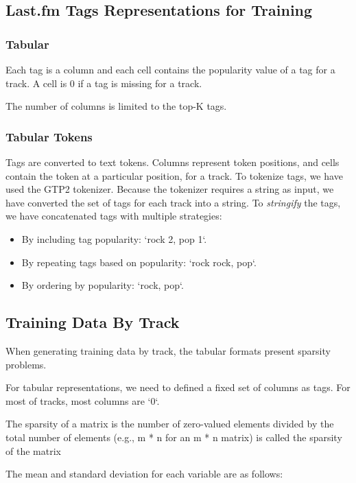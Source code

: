 \documentclass[sn-mathphys]{sn-jnl}%
\theoremstyle{thmstyleone}%
\theoremstyle{thmstyletwo}%
\theoremstyle{thmstylethree}%
\begin{document}
\subsection{Last.fm Tags Representations for Training}


\subsubsection{Tabular}
Each tag is a column and each cell contains the popularity value of a tag for a track.
A cell is 0 if a tag is missing for a track.

The number of columns is limited to the top-K tags.

\subsubsection{Tabular Tokens}

Tags are converted to text tokens. Columns represent token positions, and cells contain the token at a particular position, for a track.
To tokenize tags, we have used the GTP2 tokenizer.
Because the tokenizer requires a string as input, we have converted the set of tags for each track into a string.
To \emph{stringify} the tags, we have concatenated tags with multiple strategies:

\begin{itemize}
      \item By including tag popularity: `rock 2, pop 1`.
      \item By repeating tags based on popularity: `rock rock, pop`.
      \item By ordering by popularity: `rock, pop`.
\end{itemize}

\subsection{Training Data By Track}

When generating training data by track, the tabular formats present sparsity problems.

For tabular representations, we need to defined a fixed set of columns as tags.
For most of tracks, most columns are `0`.

The sparsity of a matrix is the number of zero-valued elements divided by the total number of elements
(e.g., m * n for an m * n matrix) is called the sparsity of the matrix

The mean and standard deviation for each variable are as follows:
\end{document}
